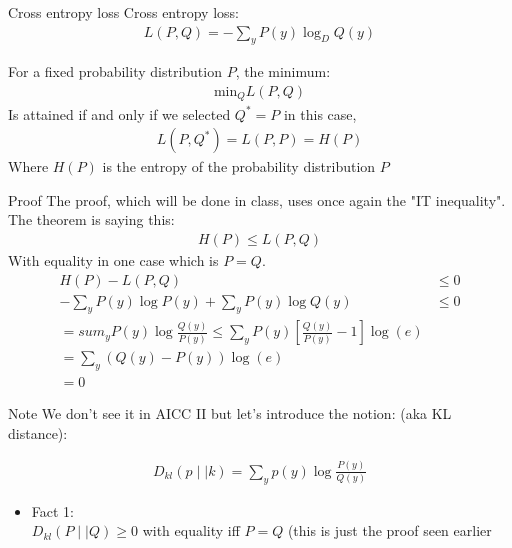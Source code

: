 \begin{parag}{Cross entropy loss}
    Cross entropy loss:
    \begin{align*}
        L(P, Q) = - \sum_y P(y)\log_DQ(y)
    \end{align*}
    \begin{theoreme}
        For a fixed probability distribution $P$, the minimum:
        \begin{align*}
            \text{min}_QL(P, Q)
        \end{align*}
        Is attained if and only if we selected $Q^* = P$ in this case, 
        \begin{align*}
            L(P, Q^*) = L(P, P) = H(P)
        \end{align*}
        Where $H(P)$ is the entropy of the probability distribution $P$
    \end{theoreme}
    
    
    \begin{subparag}{Proof}
        The proof, which will be done in class, uses once again the "IT inequality".\\
        The theorem is saying this:
        \begin{align*}
            H(P) \leq L(P, Q)
        \end{align*}
        With equality in one case which is $P = Q$.
        \begin{align*}
            H(P) - L(P, Q) &\leq 0 \\
            -\sum_yP(y)\log P(y) + \sum_y P(y) \log Q(y) &\leq 0 \\
            = sum_yP(y)\log \frac{Q(y)}{P(y)} \leq \sum_yP(y) \left[ \frac{Q(y)}{P(y)} - 1 \right]\log (e) \\
            = \sum_y(Q(y) - P(y)) \log (e) \\
            = 0
        \end{align*}
        
    \end{subparag}

    \begin{subparag}{Note}
        We don't see it in AICC II but let's introduce the notion:  (aka KL distance):
        \begin{formule}
            \begin{align*}
                D_{kl}(p \mid  \mid k) = \sum_y p(y)\log \frac{P(y)}{Q(y)}
            \end{align*}
  \begin{itemize}
      \item Fact 1: \\
          $D_{kl}(P \mid \mid Q) \geq 0$ with equality iff $P = Q$ (this is just the proof seen earlier
  \end{itemize}          
            
        \end{formule}
    \end{subparag}
\end{parag}

